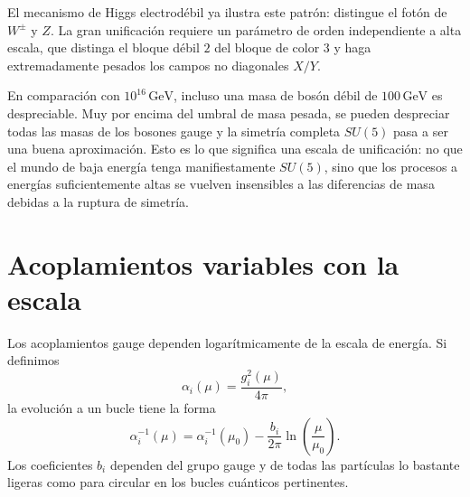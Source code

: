 \begin{classroomqa}
\end{classroomqa}

El mecanismo de Higgs electrodébil ya ilustra este patrón: distingue el fotón de \(W^\pm\) y \(Z\). La gran unificación requiere un parámetro de orden independiente a alta escala, que distinga el bloque débil \(2\) del bloque de color \(3\) y haga extremadamente pesados los campos no diagonales \(X/Y\).

En comparación con \(10^{16}\,\mathrm{GeV}\), incluso una masa de bosón débil de \(100\,\mathrm{GeV}\) es despreciable. Muy por encima del umbral de masa pesada, se pueden despreciar todas las masas de los bosones gauge y la simetría completa \(SU(5)\) pasa a ser una buena aproximación. Esto es lo que significa una escala de unificación: no que el mundo de baja energía tenga manifiestamente \(SU(5)\), sino que los procesos a energías suficientemente altas se vuelven insensibles a las diferencias de masa debidas a la ruptura de simetría.

\section{Acoplamientos variables con la escala}

Los acoplamientos gauge dependen logarítmicamente de la escala de energía. Si definimos
\begin{equation}
\alpha_i(\mu)=\frac{g_i^2(\mu)}{4\pi},
\end{equation}
la evolución a un bucle tiene la forma
\begin{equation}
\alpha_i^{-1}(\mu)
=
\alpha_i^{-1}(\mu_0)
-\frac{b_i}{2\pi}
\ln\!\left(\frac{\mu}{\mu_0}\right).
\label{eq:l10-running}
\end{equation}
Los coeficientes \(b_i\) dependen del grupo gauge y de todas las partículas lo bastante ligeras como para circular en los bucles cuánticos pertinentes.


